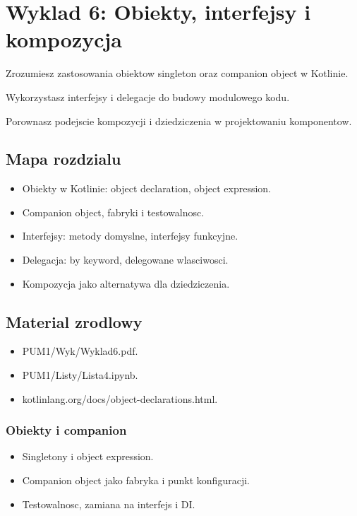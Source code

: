 \chapter{Wyklad 6: Obiekty, interfejsy i kompozycja}

\begin{learningobjectives}
  \item Zrozumiesz zastosowania obiektow singleton oraz companion object w Kotlinie.
  \item Wykorzystasz interfejsy i delegacje do budowy modulowego kodu.
  \item Porownasz podejscie kompozycji i dziedziczenia w projektowaniu komponentow.
\end{learningobjectives}

\section{Mapa rozdzialu}
\begin{itemize}
  \item Obiekty w Kotlinie: object declaration, object expression.
  \item Companion object, fabryki i testowalnosc.
  \item Interfejsy: metody domyslne, interfejsy funkcyjne.
  \item Delegacja: by keyword, delegowane wlasciwosci.
  \item Kompozycja jako alternatywa dla dziedziczenia.
\end{itemize}

\section{Material zrodlowy}
\begin{itemize}
  \item PUM1/Wyk/Wyklad6.pdf.
  \item PUM1/Listy/Lista4.ipynb.
  \item kotlinlang.org/docs/object-declarations.html.
\end{itemize}

\subsection{Obiekty i companion}
\begin{itemize}
  \item Singletony i object expression.
  \item Companion object jako fabryka i punkt konfiguracji.
  \item Testowalnosc, zamiana na interfejs i DI.
\end{itemize}

